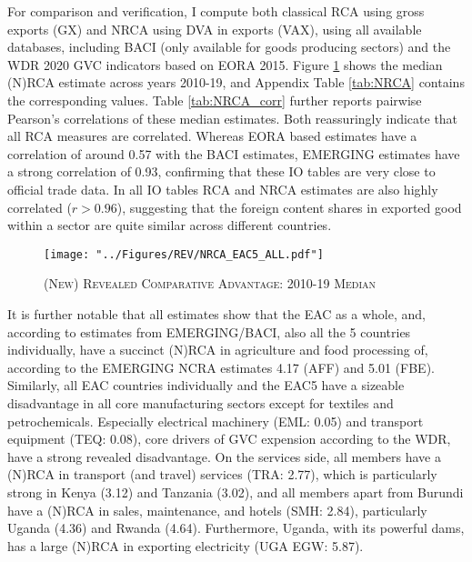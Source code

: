 \documentclass[a4paper]{article}
\begin{document}
For comparison and verification, I compute both classical RCA using gross exports (GX) and NRCA using DVA in exports (VAX), using all available databases, including BACI (only available for goods producing sectors) and the WDR 2020 GVC indicators based on EORA 2015. Figure \ref{fig:NRCA} shows the median (N)RCA estimate across years 2010-19, and Appendix Table \ref{tab:NRCA} contains the corresponding values. Table \ref{tab:NRCA_corr} further reports pairwise Pearson's correlations of these median estimates. Both reassuringly indicate that all RCA measures are correlated. Whereas EORA based estimates have a correlation of around 0.57 with the BACI estimates, EMERGING estimates have a strong correlation of 0.93, confirming that these IO tables are very close to official trade data. In all IO tables RCA and NRCA estimates are also highly correlated ($r > 0.96$), suggesting that the foreign content shares in exported good within a sector are quite similar across different countries.   

\begin{figure}[h!]
\centering
\caption{\label{fig:NRCA}\textsc{(New) Revealed Comparative Advantage: 2010-19 Median}}
\texttt{[image: "../Figures/REV/NRCA\_EAC5\_ALL.pdf"]} %
\end{figure}
\FloatBarrier

It is further notable that all estimates show that the EAC as a whole, and, according to estimates from EMERGING/BACI, also all the 5 countries individually, have a succinct (N)RCA in agriculture and food processing of, according to the EMERGING NCRA estimates 4.17 (AFF) and 5.01 (FBE). Similarly, all EAC countries individually and the EAC5 have a sizeable disadvantage in all core manufacturing sectors except for textiles and petrochemicals. Especially electrical machinery (EML: 0.05) and transport equipment (TEQ: 0.08), core drivers of GVC expension according to the WDR, have a strong revealed disadvantage. On the services side, all members have a (N)RCA in transport (and travel) services (TRA: 2.77), which is particularly strong in Kenya (3.12) and Tanzania (3.02), and all members apart from Burundi have a (N)RCA in sales, maintenance, and hotels (SMH: 2.84), particularly Uganda (4.36) and Rwanda (4.64). Furthermore, Uganda, with its powerful dams, has a large (N)RCA in exporting electricity (UGA EGW: 5.87). 
\end{document}
